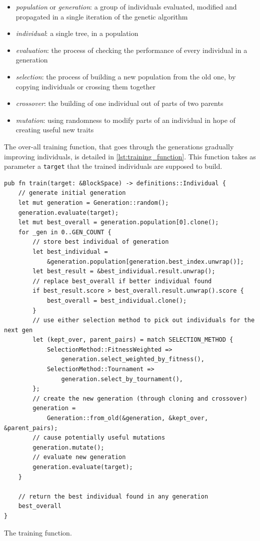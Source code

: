 \documentclass{report}
\newenvironment{code}{\captionsetup{type=listing}}{}
\begin{document}
\begin{itemize}
    \item \emph{population} or \emph{generation}: a group of individuals evaluated, modified and propagated in a single iteration of the genetic algorithm
    \item \emph{individual}: a single tree, in a population
    \item \emph{evaluation}: the process of checking the performance of every individual in a generation
    \item \emph{selection}: the process of building a new population from the old one, by copying individuals or crossing them together
    \item \emph{crossover}: the building of one individual out of parts of two parents
    \item \emph{mutation}: using randomness to modify parts of an individual in hope of creating useful new traits
\end{itemize}

The over-all training function, that goes through the generations gradually improving individuals, is detailed in \autoref{lst:training_function}. This function takes as parameter a \verb|target| that the trained individuals are supposed to build.

\begin{code}
    \begin{verbatim}
pub fn train(target: &BlockSpace) -> definitions::Individual {
    // generate initial generation
    let mut generation = Generation::random();
    generation.evaluate(target);
    let mut best_overall = generation.population[0].clone();
    for _gen in 0..GEN_COUNT {
        // store best individual of generation
        let best_individual = 
            &generation.population[generation.best_index.unwrap()];
        let best_result = &best_individual.result.unwrap();
        // replace best_overall if better individual found
        if best_result.score > best_overall.result.unwrap().score {
            best_overall = best_individual.clone();
        }
        // use either selection method to pick out individuals for the next gen
        let (kept_over, parent_pairs) = match SELECTION_METHOD {
            SelectionMethod::FitnessWeighted => 
                generation.select_weighted_by_fitness(),
            SelectionMethod::Tournament => 
                generation.select_by_tournament(),
        };
        // create the new generation (through cloning and crossover)
        generation = 
            Generation::from_old(&generation, &kept_over, &parent_pairs);
        // cause potentially useful mutations
        generation.mutate();
        // evaluate new generation
        generation.evaluate(target);
    }

    // return the best individual found in any generation
    best_overall
}
    \end{verbatim}
    \caption{The training function.}
    \label{lst:training_function}
\end{code}
\end{document}
